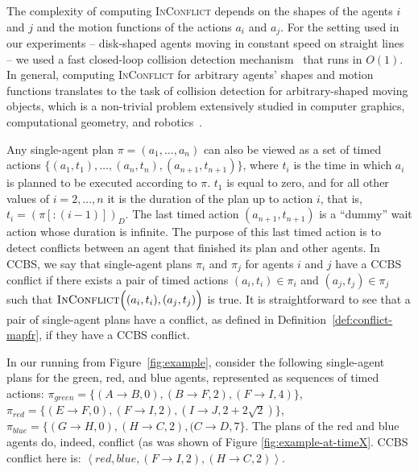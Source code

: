 \documentclass[review]{elsarticle}
\newtheorem{lemma}{Lemma}
\newcommand{\tuple}[1]{\ensuremath{\left \langle #1 \right \rangle }}
\newcommand\konstantin[1]{\nb{\textbf{Konstantin:}}{red}{#1}}
\newcommand\roni[1]{\nb{\textbf{Roni:}}{green}{#1}}
\newcommand{\ccbs}{\ac{CCBS}\xspace}
\newcommand{\inconflict}{\textsc{InConflict}\xspace}
\begin{document}
The complexity of computing \inconflict depends on the shapes of the agents $i$ and $j$ and the motion functions of the actions $a_i$ and $a_j$. For the setting used in our experiments -- disk-shaped agents moving in constant speed on straight lines -- we used a fast closed-loop collision detection mechanism~\cite{guy2015} that runs in $O(1)$. 
In general, computing \inconflict for arbitrary agents' shapes and motion functions translates to the task of collision detection for arbitrary-shaped moving objects, which is a non-trivial problem extensively studied in computer graphics, computational geometry, and robotics~\cite{jimenez20013d}. 


Any single-agent plan $\pi = (a_1,\ldots, a_n)$ can also be viewed as a set of timed actions $\big\{ (a_1,t_1),\ldots,(a_n,t_n) ,(a_{n+1},t_{n+1}) \big\}$, where $t_i$ is the time in which $a_i$ is planned to be executed according to $\pi$. 
$t_1$ is equal to zero, and for all other values of $i=2,\ldots, n$ it is the duration of the plan up to action $i$, that is, $t_i=(\pi[:(i-1)])_D$. 
The last timed action $(a_{n+1}, t_{n+1})$ is a ``dummy'' wait action whose duration is infinite. The purpose of this last timed action is to detect conflicts between an agent that finished its plan and other agents. 
In \ccbs, we say that single-agent plans $\pi_i$ and $\pi_j$ for agents $i$ and $j$ have a \ccbs  conflict if there exists a pair of timed actions $(a_i,t_i)\in \pi_i$ and $(a_j,t_j)\in \pi_j$ such that $\inconflict \Big((a_i,t_i), (a_j,t_j)\Big)$ is true. 
It is straightforward to see that a pair of single-agent plans 
have a conflict, as defined in Definition~\ref{def:conflict-mapfr},
if they have a \ccbs conflict.


In our running from Figure~\ref{fig:example}, consider the following single-agent plans for the green, red, and blue agents, represented as sequences of timed actions:  $\pi_{green}=\{(A \rightarrow B, 0), (B \rightarrow F, 2), (F \rightarrow I, 4)\}$, $\pi_{red}=\{(E \rightarrow F, 0), (F \rightarrow I, 2), (I \rightarrow J, 2+2\sqrt{2})\}$, $\pi_{blue}=\{(G \rightarrow H, 0), (H \rightarrow C, 2), (C \rightarrow D, 7\}$. The plans of the red and blue agents do, indeed, conflict (as was shown of Figure \ref{fig:example-at-timeX}. \ccbs conflict here is: $\tuple{red, blue, (F \rightarrow I, 2), (H \rightarrow C, 2)}$.  


\end{document}
